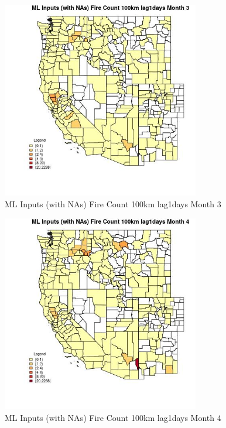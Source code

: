 \begin{figure} 
\centering  
\includegraphics[width=0.77\textwidth]{Code_Outputs/Report_ML_input_PM25_Step4_part_e_de_duplicated_aves_compiled_2019-05-20wNAs_CountyFire_Count_100km_lag1daysmedianMonth3.jpg} 
\caption{\label{fig:Report_ML_input_PM25_Step4_part_e_de_duplicated_aves_compiled_2019-05-20wNAsCountyFire_Count_100km_lag1daysmedianMonth3}ML Inputs (with NAs) Fire Count 100km lag1days Month 3} 
\end{figure} 
 

\begin{figure} 
\centering  
\includegraphics[width=0.77\textwidth]{Code_Outputs/Report_ML_input_PM25_Step4_part_e_de_duplicated_aves_compiled_2019-05-20wNAs_CountyFire_Count_100km_lag1daysmedianMonth4.jpg} 
\caption{\label{fig:Report_ML_input_PM25_Step4_part_e_de_duplicated_aves_compiled_2019-05-20wNAsCountyFire_Count_100km_lag1daysmedianMonth4}ML Inputs (with NAs) Fire Count 100km lag1days Month 4} 
\end{figure} 
 

